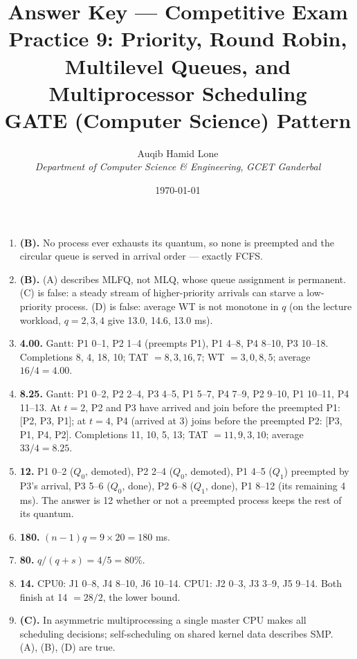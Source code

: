 \documentclass[11pt]{article}
\title{Answer Key --- Competitive Exam Practice 9: Priority, Round Robin,\\Multilevel Queues, and Multiprocessor Scheduling\\\large GATE (Computer Science) Pattern}
\author{Auqib Hamid Lone\\[0.3em]
  \emph{Department of Computer Science \& Engineering}, \emph{GCET Ganderbal}}
\date{\today}
\begin{document}
\maketitle

\begin{enumerate}
\item[\textbf{Q1}] \textbf{(B).} No process ever exhausts its quantum, so none is preempted and the circular queue is served in arrival order --- exactly FCFS.

\item[\textbf{Q2}] \textbf{(B).} (A) describes MLFQ, not MLQ, whose queue assignment is permanent. (C) is false: a steady stream of higher-priority arrivals can starve a low-priority process. (D) is false: average WT is not monotone in $q$ (on the lecture workload, $q=2,3,4$ give 13.0, 14.6, 13.0 ms).

\item[\textbf{Q3}] \textbf{4.00.} Gantt: P1 0--1, P2 1--4 (preempts P1), P1 4--8, P4 8--10, P3 10--18. Completions 8, 4, 18, 10; TAT $= 8, 3, 16, 7$; WT $= 3, 0, 8, 5$; average $16/4 = 4.00$.

\item[\textbf{Q4}] \textbf{8.25.} Gantt: P1 0--2, P2 2--4, P3 4--5, P1 5--7, P4 7--9, P2 9--10, P1 10--11, P4 11--13. At $t=2$, P2 and P3 have arrived and join before the preempted P1: [P2, P3, P1]; at $t=4$, P4 (arrived at 3) joins before the preempted P2: [P3, P1, P4, P2]. Completions 11, 10, 5, 13; TAT $= 11, 9, 3, 10$; average $33/4 = 8.25$.

\item[\textbf{Q5}] \textbf{12.} P1 0--2 ($Q_0$, demoted), P2 2--4 ($Q_0$, demoted), P1 4--5 ($Q_1$) preempted by P3's arrival, P3 5--6 ($Q_0$, done), P2 6--8 ($Q_1$, done), P1 8--12 (its remaining 4 ms). The answer is 12 whether or not a preempted process keeps the rest of its quantum.

\item[\textbf{Q6}] \textbf{180.} $(n-1)q = 9 \times 20 = 180$ ms.

\item[\textbf{Q7}] \textbf{80.} $q/(q+s) = 4/5 = 80\%$.

\item[\textbf{Q8}] \textbf{14.} CPU0: J1 0--8, J4 8--10, J6 10--14. CPU1: J2 0--3, J3 3--9, J5 9--14. Both finish at 14 $= 28/2$, the lower bound.

\item[\textbf{Q9}] \textbf{(C).} In asymmetric multiprocessing a single master CPU makes all scheduling decisions; self-scheduling on shared kernel data describes SMP. (A), (B), (D) are true.
\end{enumerate}
\end{document}
